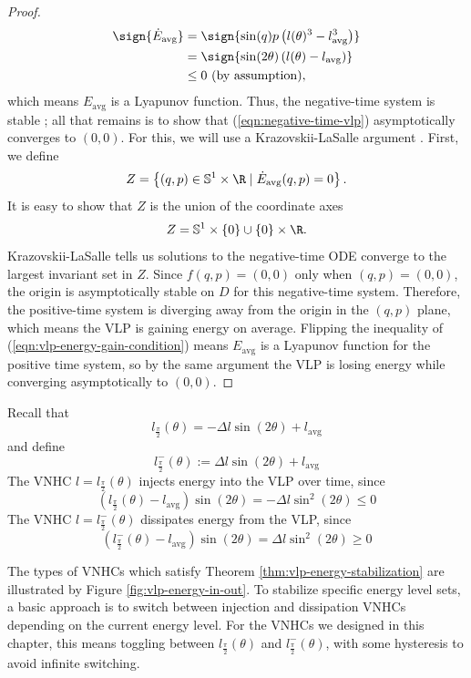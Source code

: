 \begin{proof}
\begin{align*}
    \sign{\dot{E}_\text{avg}} &= \sign{\sin(q)p \left(l(\theta)^3 - l_\text{avg}^3\right)} \\
                &= \sign{\sin(2\theta) \left(l(\theta) - l_\text{avg}\right)} \\
                &\leq 0 \text{ (by assumption)}
      ,
   \end{align*}
   which means \(E_\text{avg}\) is a Lyapunov function.
   Thus, the negative-time system is stable \cite{lyapunov}; all that remains is
   to show that (\ref{eqn:negative-time-vlp}) asymptotically converges to
   \((0,0)\). 
   For this, we will use a Krazovskii-LaSalle argument
   \cite{krazovskii_lasalle}.
   First, we define 
   \[
      Z = \left\{(q,p) \in \mathbb{S}^1\times \R \mid 
      \dot{E}_\text{avg}(q,p) = 0 \right\}
      .
   \]
   It is easy to show that \(Z\) is the union of the coordinate axes
   \[
      Z= \mathbb{S}^1 \times \left\{0\right\} \cup 
         \left\{0\right\} \times \R
      .
   \]
   Krazovskii-LaSalle tells us solutions to the negative-time ODE converge to
   the largest invariant set in \(Z\).
   Since \(f(q,p) = (0,0)\) only when \((q,p) = (0,0)\),
   the origin is asymptotically stable on \(D\) for this negative-time system.
   Therefore, the positive-time system is diverging away from the origin 
   in the \((q,p)\) plane, which means the VLP is gaining energy on average.
   Flipping the inequality of (\ref{eqn:vlp-energy-gain-condition}) 
   means \(E_\text{avg}\) is a Lyapunov function for the positive time system,
   so by the same argument the VLP is losing energy while converging
   asymptotically to \((0,0)\).
 \end{proof}

\begin{cor}
   Recall that
   \[
      l_\frac{\pi}{2}(\theta) = -\Delta l \sin(2\theta) + l_\text{avg}
   \]
   and define 
   \[
      l^{-}_\frac{\pi}{2}(\theta) := \Delta l \sin(2\theta) + l_\text{avg}
   \]
   The VNHC \(l = l_\frac{\pi}{2}(\theta)\) injects energy into the VLP
   over time, since 
   \[
      \left(l_\frac{\pi}{2}(\theta) - l_\text{avg}\right)\sin(2\theta) = 
      -\Delta l \sin^2(2\theta) \leq 0
   \] 
   The VNHC \(l = l^{-}_\frac{\pi}{2}(\theta)\) dissipates energy
   from the VLP, since 
   \[
      \left(l^{-}_\frac{\pi}{2}(\theta) - l_\text{avg}\right)\sin(2\theta) = 
      \Delta l \sin^2(2\theta) \geq 0
   \] 
\end{cor}

The types of VNHCs which satisfy Theorem \ref{thm:vlp-energy-stabilization} are
illustrated by Figure \ref{fig:vlp-energy-in-out}. 
To stabilize specific energy level sets, a basic approach is to switch
between injection and dissipation VNHCs depending on the current energy level.
For the VNHCs we designed in this chapter, this means toggling
between \(l_\frac{\pi}{2}(\theta)\) and \(l^{-}_\frac{\pi}{2}(\theta)\),
with some hysteresis to avoid infinite switching.  

